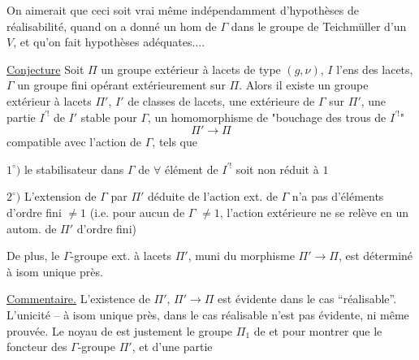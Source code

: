 On aimerait que ceci soit vrai même indépendamment d'hypothèses de réalisabilité,
quand on a donné un hom de $\Gamma$ dans le groupe de Teichmüller d'un $V$,
et qu'on fait  hypothèses adéquates....

\uline{Conjecture} Soit $\Pi$ un groupe extérieur à lacets de type $(g,\nu)$,
$I$ l'ens  des  lacets,
$\Gamma$ un groupe fini opérant extérieurement sur $\Pi$.
Alors il existe un groupe extérieur à lacets $\Pi'$,  $I'$ de classes
de lacets, une  extérieure de $\Gamma$ sur $\Pi'$, une partie
$I^{\prime!}$ de $I'$ stable pour $\Gamma$, un homomorphisme 
de "bouchage des trous de $I^{\prime!}$"
\[
\Pi'\longrightarrow\Pi
\]
compatible avec l'action de $\Gamma$, tels que


$1^\circ)$ le stabilisateur dans $\Gamma$ de $\forall$ élément de $I^{\prime!}$ soit non réduit à $1$

$2^\circ)$ L'extension de $\Gamma$ par $\Pi'$ déduite de l'action ext. de $\Gamma$ n'a pas d'éléments d'ordre fini $\ne 1$ (i.e. pour aucun  de $\Gamma$ $\ne 1$, l'action extérieure  ne se relève en un autom. de $\Pi'$ d'ordre fini)

De plus, le $\Gamma$-groupe ext. à lacets $\Pi'$, muni du morphisme $\Pi'\longrightarrow\Pi$, est déterminé à isom unique près.

 \uline{Commentaire.} L'existence de $\Pi'$,  $\Pi'\longrightarrow\Pi$ est évidente dans le cas ``réalisable''. L'unicité -- à isom unique près,  dans le cas réalisable n'est pas évidente, ni même prouvée. Le noyau de 
est justement le groupe $\Pi_1$ de 
et pour montrer que le foncteur des   $\Gamma$-groupe  $\Pi'$,  et d'une partie


